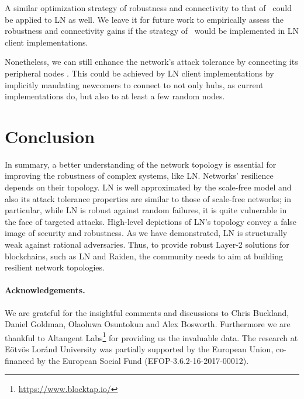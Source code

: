 \documentclass[runningheads]{llncs}
\begin{document}
A similar optimization strategy of robustness and connectivity to that of~\cite{shargel2003optimization} could be applied to LN as well. We leave it for future work to empirically assess the robustness and connectivity gains if the strategy of~\cite{shargel2003optimization} would be implemented in LN client implementations. 

Nonetheless, we can still enhance the network's attack tolerance by connecting its peripheral nodes \cite{barabasi2016network}. This could be achieved by LN client implementations by implicitly mandating newcomers to connect to not only hubs, as current implementations do, but also to at least a few random nodes.

\section{Conclusion}
In summary, a better understanding of the network topology is essential
for improving the robustness of complex systems, like LN. Networks' resilience depends on their topology. LN is well approximated by the scale-free model and also its attack tolerance properties are similar to those of scale-free networks; in particular, while LN is robust against random failures, it is quite vulnerable in the face of targeted attacks. 
High-level depictions of LN's topology convey a false image of security and robustness. As we have demonstrated, LN is structurally weak against rational adversaries. Thus, to provide robust Layer-2 solutions for blockchains, such as LN and Raiden, the community needs to aim at building resilient network topologies.
\paragraph{\textbf{Acknowledgements.}}
We are grateful for the insightful comments and discussions to Chris Buckland, Daniel Goldman, Olaoluwa Osuntokun and Alex Bosworth. Furthermore we are thankful to Altangent Labs\footnote{\url{https://www.blocktap.io/}} for providing us the invaluable data.  The research at Eötvös Loránd University was partially supported by the European Union, co-financed by the European Social Fund (EFOP-3.6.2-16-2017-00012).
%
%
%
\newpage


\end{document}
